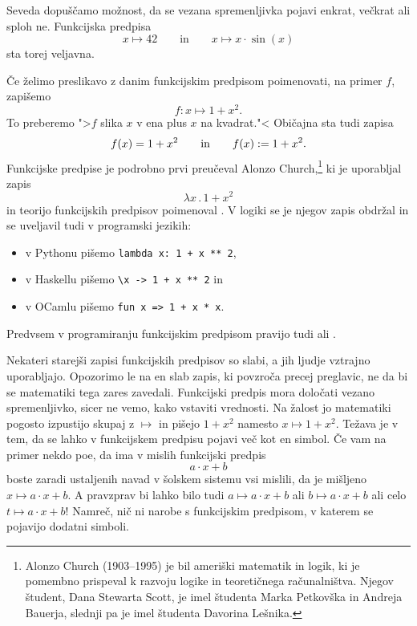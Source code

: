 Seveda dopuščamo možnost, da se vezana spremenljivka pojavi enkrat, večkrat ali sploh ne.
Funkcijska predpisa
%
%
\begin{equation*}
  x \mapsto 42
  \qquad\text{in}\qquad
  x \mapsto x \cdot \sin(x)
\end{equation*}
%
sta torej veljavna.

Če želimo preslikavo z danim funkcijskim predpisom poimenovati, na primer $f$, zapišemo
%
\begin{equation*}
  f : x \mapsto 1 + x^2.
\end{equation*}
%
To preberemo ">$f$ slika $x$ v ena plus $x$ na kvadrat."< Običajna sta tudi zapisa
%
\begin{equation*}
  f(x) = 1 + x^2
  \qquad\text{in}\qquad
  f(x) \mathrel{{:}{=}} 1 + x^2.
\end{equation*}
%
Funkcijske predpise je podrobno prvi preučeval Alonzo Church,\footnote{Alonzo Church
  (1903--1995) je bil ameriški matematik in logik, ki je pomembno prispeval k razvoju
  logike in teoretičnega računalništva. Njegov študent, Dana Stewarta Scott, je imel
  študenta Marka Petkovška in Andreja Bauerja, slednji pa je imel študenta Davorina
  Lešnika.} ki je uporabljal zapis
%
\begin{equation*}
  \lambda x \,.\, 1 + x^2
\end{equation*}
%
in teorijo funkcijskih predpisov poimenoval . V logiki se je njegov
zapis obdržal in se uveljavil tudi v programski jezikih:
%
\begin{itemize}
\item v Pythonu pišemo \verb|lambda x: 1 + x ** 2|,
\item v Haskellu pišemo \verb|\x -> 1 + x ** 2| in
\item v OCamlu pišemo \verb|fun x => 1 + x * x|.
\end{itemize}
%
Predvsem v programiranju funkcijskim predpisom pravijo tudi  ali .

Nekateri starejši zapisi funkcijskih predpisov so slabi, a jih ljudje vztrajno
uporabljajo. Opozorimo le na en slab zapis, ki povzroča precej preglavic, ne da bi se
matematiki tega zares zavedali. Funkcijski predpis mora določati vezano spremenljivko,
sicer ne vemo, kako vstaviti vrednosti. Na žalost jo matematiki pogosto izpustijo skupaj
z $\mapsto$ in pišejo $1 + x^2$ namesto $x \mapsto 1 + x^2$.
%
Težava je v tem, da se lahko v funkcijskem predpisu pojavi več kot en simbol. Če vam na primer nekdo poe, da ima v mislih funkcijski predpis
%
\begin{equation*}
  a \cdot x + b
\end{equation*}
%
boste zaradi ustaljenih navad v šolskem sistemu vsi mislili, da je mišljeno $x \mapsto a \cdot x + b$.
%
A pravzprav bi lahko bilo tudi $a \mapsto a \cdot x + b$ ali $b \mapsto a \cdot x + b$ ali celo
$t \mapsto a \cdot x + b$! Namreč, nič ni narobe s funkcijskim predpisom, v katerem se
pojavijo dodatni simboli.


